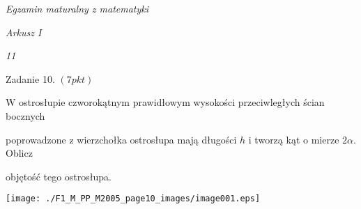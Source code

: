 \documentclass[a4paper,12pt]{article}
\begin{document}
{\it Egzamin maturalny z matematyki}

{\it Arkusz I}

{\it 11}

Zadanie 10. $(7pkt)$

$\mathrm{W}$ ostrosłupie czworokątnym prawidłowym wysokości przeciwległych ścian bocznych

poprowadzone z wierzchołka ostrosłupa mają długości $h$ i tworzą kąt o mierze $ 2\alpha$. Oblicz

objętość tego ostrosłupa.
\begin{center}
\texttt{[image: ./F1\_M\_PP\_M2005\_page10\_images/image001.eps]}
\end{center}
\end{document}
